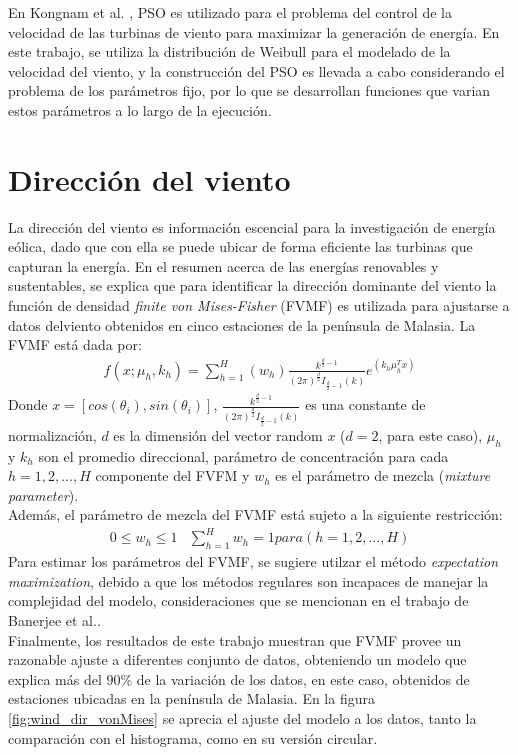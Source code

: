 En Kongnam et al. \cite{Kongnam15}, PSO es utilizado para el problema del control de la velocidad de las turbinas de viento para maximizar la generación de energía. En este trabajo, se utiliza la distribución de Weibull para el modelado de la velocidad del viento, y la construcción del PSO es llevada a cabo considerando el problema de los parámetros fijo, por lo que se desarrollan funciones que varian estos parámetros a lo largo de la ejecución.\\
\section{Dirección del viento}
La dirección del viento es información escencial para la investigación de energía eólica, dado que con ella se puede ubicar de forma eficiente las turbinas que capturan la energía. En el resumen acerca de las energías renovables y sustentables\cite{Winddirelse15}, se explica que para identificar la dirección dominante del viento la función de densidad \emph{finite von Mises-Fisher} (FVMF) es utilizada para ajustarse a datos delviento obtenidos en cinco estaciones de la península de Malasia. La FVMF está dada por:
\begin{align}
    f(x;\mu_{h}, k_{h}) = \sum_{h=1}^{H}(w_{h})\frac{k^{\frac{d}{2} - 1}}{(2\pi)^{\frac{d}{2}}I_{\frac{d}{2} - 1} (k)}e^{(k_h\mu_{h}^{T}x)}
\end{align}    
Donde $x=[cos(\theta_i), sin(\theta_i)]$, $\frac{k^{\frac{d}{2} - 1}}{(2\pi)^{\frac{d}{2}}I_{\frac{d}{2} - 1} (k)}$ es una constante de normalización, $d$ es la dimensión del vector random $x$ ($d = 2$, para este caso), $\mu_{h}$ y $k_h$ son el promedio direccional, parámetro de concentración para cada $h = 1, 2,...,H$ componente del FVFM y $w_h$ es el parámetro de mezcla (\emph{mixture parameter}).\\
Además, el parámetro de mezcla del FVMF está sujeto a la siguiente restricción:
\begin{align}
    0 \leq w_h \leq 1 & \sum_{h=1}^{H} w_{h} = 1 para (h=1,2,...,H) 
\end{align}
Para estimar los parámetros del FVMF, se sugiere utilzar el método \emph{expectation maximization}, debido a que los métodos regulares son incapaces de manejar la complejidad del modelo, consideraciones que se mencionan en el trabajo de Banerjee et al.\cite{Banerjee05}.\\
Finalmente, los resultados de este trabajo muestran que FVMF provee un razonable ajuste a diferentes conjunto de datos, obteniendo un modelo que explica más del $90\%$ de la variación de los datos, en este caso, obtenidos de estaciones ubicadas en la península de Malasia. En la figura \ref{fig:wind_dir_vonMises} se aprecia el ajuste del modelo a los datos, tanto la comparación con el histograma, como en su versión circular.\\
